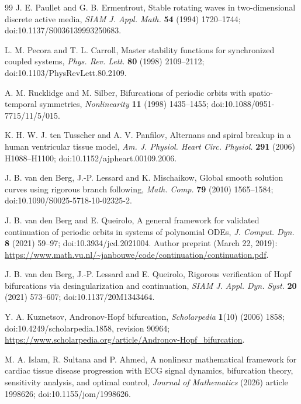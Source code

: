 \documentclass[11pt]{article}
\theoremstyle{definition}
\begin{document}
\begin{thebibliography}{99}
 J. E. Paullet and G. B. Ermentrout, Stable rotating waves in two-dimensional discrete active media, \emph{SIAM J. Appl. Math.} \textbf{54} (1994) 1720--1744; doi:10.1137/S0036139993250683.

 L. M. Pecora and T. L. Carroll, Master stability functions for synchronized coupled systems, \emph{Phys. Rev. Lett.} \textbf{80} (1998) 2109--2112; doi:10.1103/PhysRevLett.80.2109.

 A. M. Rucklidge and M. Silber, Bifurcations of periodic orbits with spatio-temporal symmetries, \emph{Nonlinearity} \textbf{11} (1998) 1435--1455; doi:10.1088/0951-7715/11/5/015.

 K. H. W. J. ten Tusscher and A. V. Panfilov, Alternans and spiral breakup in a human ventricular tissue model, \emph{Am. J. Physiol. Heart Circ. Physiol.} \textbf{291} (2006) H1088--H1100; doi:10.1152/ajpheart.00109.2006.

 J. B. van den Berg, J.-P. Lessard and K. Mischaikow, Global smooth solution curves using rigorous branch following, \emph{Math. Comp.} \textbf{79} (2010) 1565--1584; doi:10.1090/S0025-5718-10-02325-2.

 J. B. van den Berg and E. Queirolo, A general framework for validated continuation of periodic orbits in systems of polynomial ODEs, \emph{J. Comput. Dyn.} \textbf{8} (2021) 59--97; doi:10.3934/jcd.2021004. Author preprint (March 22, 2019): \url{https://www.math.vu.nl/~janbouwe/code/continuation/continuation.pdf}.

 J. B. van den Berg, J.-P. Lessard and E. Queirolo, Rigorous verification of Hopf bifurcations via desingularization and continuation, \emph{SIAM J. Appl. Dyn. Syst.} \textbf{20} (2021) 573--607; doi:10.1137/20M1343464.

 Y. A. Kuznetsov, Andronov-Hopf bifurcation, \emph{Scholarpedia} \textbf{1}(10) (2006) 1858; doi:10.4249/scholarpedia.1858, revision 90964; \url{https://www.scholarpedia.org/article/Andronov-Hopf_bifurcation}.

 M. A. Islam, R. Sultana and P. Ahmed, A nonlinear mathematical framework for cardiac tissue disease progression with ECG signal dynamics, bifurcation theory, sensitivity analysis, and optimal control, \emph{Journal of Mathematics} (2026) article 1998626; doi:10.1155/jom/1998626.

\end{thebibliography}
\end{document}
